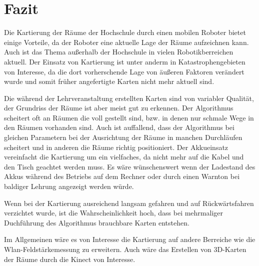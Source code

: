 \chapter{Fazit} %
\label{cha:fazit}

Die Kartierung der Räume der Hochschule durch einen mobilen Roboter bietet einige Vorteile, da der Roboter eine aktuelle Lage der Räume aufzeichnen kann. Auch ist das Thema außerhalb der Hochschule in vielen Robotikberreichen aktuell. Der Einsatz von Kartierung ist unter anderm in Katastrophengebieten von Interesse, da die dort vorherschende Lage von äußeren Faktoren verändert wurde und somit früher angefertigte Karten nicht mehr aktuell sind.\par
Die während der Lehrveranstaltung erstellten Karten sind von variabler Qualität, der Grundriss der Räume ist aber meist gut zu erkennen. Der Algorithmus scheitert oft an Räumen die voll gestellt sind, bzw. in denen nur schmale Wege in den Räumen vorhanden sind. Auch ist auffallend, dass der Algorithmus bei gleichen Parametern bei der Ausrichtung der Räume in manchen Durchläufen scheitert und in anderen die Räume richtig positioniert. Der Akkueinsatz vereinfacht die Kartierung um ein vielfaches, da nicht mehr auf die Kabel und den Tisch geachtet werden muss. Es wäre wünschenswert wenn der Ladestand des Akkus während des Betriebs auf dem Rechner oder durch einen Warnton bei baldiger Lehrung angezeigt werden würde.\par
Wenn bei der Kartierung ausreichend langsam gefahren und auf Rückwärtsfahren verzichtet wurde, ist die Wahrscheinlichkeit hoch, dass bei mehrmaliger Duchführung des Algorithmus brauchbare Karten entstehen.\par
Im Allgemeinen wäre es von Interesse die Kartierung auf andere Berreiche wie die Wlan-Feldstärkemessung zu erweitern. Auch wäre das Erstellen von 3D-Karten der Räume durch die Kinect von Interesse.

